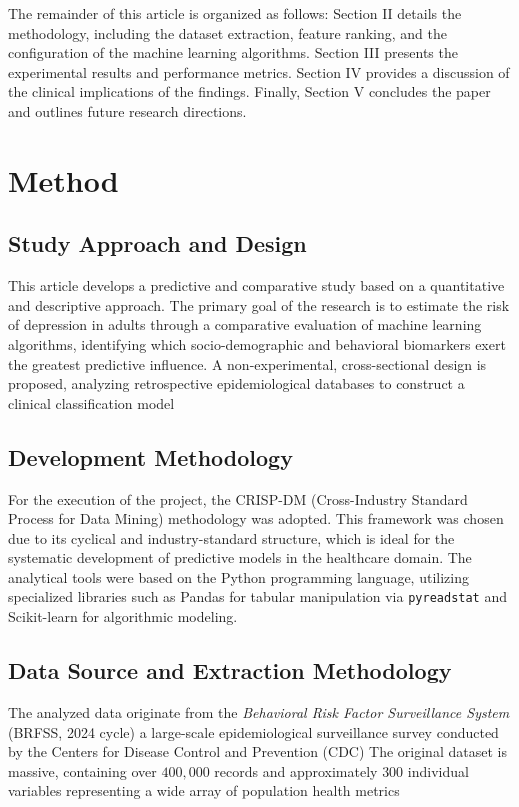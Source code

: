 \documentclass[conference]{IEEEtran}
\begin{document}
The remainder of this article is organized as follows: Section II details the methodology, including the dataset extraction, feature ranking, and the configuration of the machine learning algorithms. Section III presents the experimental results and performance metrics. Section IV provides a discussion of the clinical implications of the findings. Finally, Section V concludes the paper and outlines future research directions.

\section{Method}

\subsection{Study Approach and Design}
This article develops a predictive and comparative study based on a quantitative and descriptive approach. The primary goal of the research is to estimate the risk of depression in adults through a comparative evaluation of machine learning algorithms, identifying which socio-demographic and behavioral biomarkers exert the greatest predictive influence. A non-experimental, cross-sectional design is proposed, analyzing retrospective epidemiological databases to construct a clinical classification model \cite{sokolov_decoding_2024} %

\subsection{Development Methodology}
For the execution of the project, the CRISP-DM (Cross-Industry Standard Process for Data Mining) methodology \cite{chapman2000crisp} %
was adopted. This framework was chosen due to its cyclical and industry-standard structure, which is ideal for the systematic development of predictive models in the healthcare domain. The analytical tools were based on the Python programming language, utilizing specialized libraries such as Pandas \cite{mckinney2010pandas} %
for tabular manipulation via \texttt{pyreadstat} %
and Scikit-learn \cite{scikit-learn} %
for algorithmic modeling.

\subsection{Data Source and Extraction Methodology}
The analyzed data originate from the \textit{Behavioral Risk Factor Surveillance System} (BRFSS, 2024 cycle) %
a large-scale epidemiological surveillance survey conducted by the Centers for Disease Control and Prevention (CDC) \cite{cdc2024brfss} %
The original dataset is massive, containing over $400,000$ records and approximately $300$ individual variables representing a wide array of population health metrics %
\end{document}
